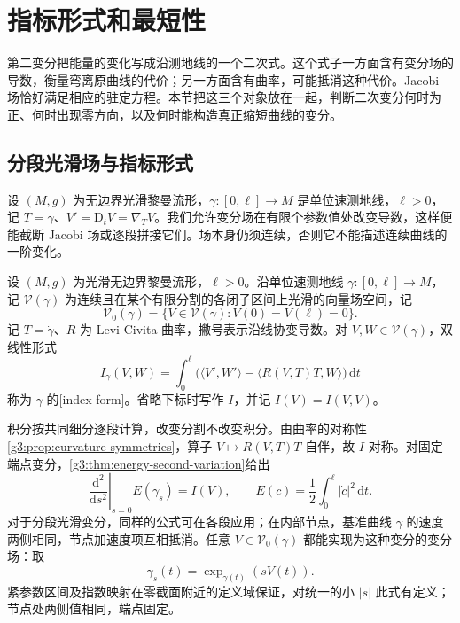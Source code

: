 
% 
% 

\section{指标形式和最短性}
\label{g3:sec:0603}

第二变分把能量的变化写成沿测地线的一个二次式。这个式子一方面含有变分场的导数，衡量弯离原曲线的代价；另一方面含有曲率，可能抵消这种代价。Jacobi 场恰好满足相应的驻定方程。本节把这三个对象放在一起，判断二次变分何时为正、何时出现零方向，以及何时能构造真正缩短曲线的变分。

\subsection{分段光滑场与指标形式}
\label{g3:subsec:0603:01}

设 \((M,g)\) 为无边界光滑黎曼流形，\(\gamma:[0,\ell]\to M\) 是单位速测地线，\(\ell>0\)，记 \(T=\dot\gamma\)、\(V'=\mathrm D_tV=\nabla_TV\)。我们允许变分场在有限个参数值处改变导数，这样便能截断 Jacobi 场或逐段拼接它们。场本身仍须连续，否则它不能描述连续曲线的一阶变化。

\begin{definition}\label{g3:def:index-form}
	设 \((M,g)\) 为光滑无边界黎曼流形，\(\ell>0\)。沿单位速测地线 \(\gamma:[0,\ell]\to M\)，记 \(\mathcal V(\gamma)\) 为连续且在某个有限分割的各闭子区间上光滑的向量场空间，记
	\[
		\mathcal V_0(\gamma)=
		\{V\in\mathcal V(\gamma):V(0)=V(\ell)=0\}.
	\]
	记 \(T=\dot\gamma\)、\(R\) 为 Levi-Civita 曲率，撇号表示沿线协变导数。对 \(V,W\in\mathcal V(\gamma)\)，双线性形式
	\begin{equation}\label{g3:eq:index-form}
		I_\gamma(V,W)=
		\int_0^\ell
		\bigl(\langle V',W'\rangle
		-\langle R(V,T)T,W\rangle\bigr)\,\mathrm dt
	\end{equation}
	称为 \(\gamma\) 的[index form]。省略下标时写作 \(I\)，并记 \(I(V)=I(V,V)\)。
\end{definition}

积分按共同细分逐段计算，改变分割不改变积分。由曲率的对称性\cref{g3:prop:curvature-symmetries}，算子 \(V\mapsto R(V,T)T\) 自伴，故 \(I\) 对称。对固定端点变分，\cref{g3:thm:energy-second-variation}给出
\[
	\left.\frac{\mathrm d^2}{\mathrm ds^2}\right|_{s=0}
	E(\gamma_s)=I(V),
	\qquad
	E(c)=\frac12\int_0^\ell|\dot c|^2\,\mathrm dt.
\]
对于分段光滑变分，同样的公式可在各段应用；在内部节点，基准曲线 \(\gamma\) 的速度两侧相同，节点加速度项互相抵消。任意 \(V\in\mathcal V_0(\gamma)\) 都能实现为这种变分的变分场：取
\[
	\gamma_s(t)=\exp_{\gamma(t)}(sV(t)).
\]
紧参数区间及指数映射在零截面附近的定义域保证，对统一的小 \(|s|\) 此式有定义；节点处两侧值相同，端点固定。

